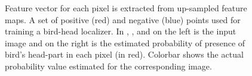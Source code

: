 \documentclass[10pt,twocolumn,letterpaper]{article}
\begin{document}
\begin{figure}
	\centering
	\caption{
 Feature vector for each pixel is extracted from up-sampled feature maps.  A set of positive (red) and negative (blue) points used for training a bird-head localizer.
In , , and  on the left is the input image and on the right is the estimated probability of presence of bird's head-part in each pixel (in red). Colorbar shows the actual probability value estimated for the corresponding image.
}
	\label{fig:results}
\end{figure}
\end{document}
